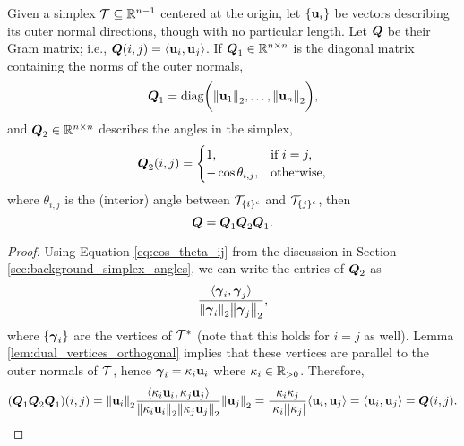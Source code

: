 \begin{lemma}
	Given a simplex $\mathcal{T}\subseteq\mathbb{R}^{n-1}$ centered at the origin, let $\{\vb{u}_i\}$ be vectors describing its outer normal directions, though with no particular length. Let $\vb*{Q}$ be their Gram matrix; i.e., $\vb*{Q}(i,j)=\langle \vb{u}_i,\vb{u}_j\rangle$. If $\vb*{Q}_1\in\mathbb{R}^{n\times n}$ is the diagonal matrix containing the norms of the outer normals, 
	\begin{equation*}
	\vb*{Q}_1 = \text{diag}\bigg(\norm{\vb{u}_1}_2,\dots,\norm{\vb{u}_n}_2\bigg),
	\end{equation*}
	and $\vb*{Q}_2\in\mathbb{R}^{n\times n}$ describes the angles in the simplex, 
	\begin{equation*}
	\vb*{Q}_2(i,j) = \begin{cases}
	1,& \text{if } i=j,\\
	-\cos\theta_{i,j},&\text{otherwise},
	\end{cases} 
	\end{equation*}
	where $\theta_{i,j}$ is the (interior) angle between $\mathcal{T}_{\{i\}^c}$ and $\mathcal{T}_{\{j\}^c}$, then 
	\begin{equation*}
	\vb*{Q} = \vb*{Q}_1 \vb*{Q}_2 \vb*{Q}_1.
	\end{equation*}
\end{lemma}
\begin{proof}
	Using Equation \ref{eq:cos_theta_ij} from the discussion in Section \ref{sec:background_simplex_angles}, we can write the entries of $\vb*{Q}_2$ as 
	\[\frac{\langle \vb*{\gamma}_i,\vb*{\gamma}_j\rangle}{\norm{\vb*{\gamma}_i}_2\norm{\vb*{\gamma}_j}_2},\]
	where $\{\vb*{\gamma}_i\}$ are the vertices of $\mathcal{T}^*$ (note that this holds for $i=j$ as well). Lemma \ref{lem:dual_vertices_orthogonal} implies that these vertices are parallel to the outer normals of $\mathcal{T}$, hence  $\vb*{\gamma}_i = \kappa_i \vb{u}_i$ where $\kappa_i\in \mathbb{R}_{> 0}$. Therefore, 
	\begin{equation*}
	(\vb*{Q}_1\vb*{Q}_2\vb*{Q}_1)(i,j) = \norm{\vb{u}_i}_2 \frac{\langle \kappa_i\vb{u}_i,\kappa_j\vb{u}_j\rangle}{\norm{\kappa_i\vb{u}_i}_2\norm{\kappa_j\vb{u}_j}_2}\norm{\vb{u}_j}_2 = \frac{\kappa_i\kappa_j}{|\kappa_i||\kappa_j|}\langle \vb{u}_i,\vb{u}_j\rangle = \langle \vb{u}_i,\vb{u}_j\rangle=\vb*{Q}(i,j).\qedhere
	\end{equation*}
\end{proof}

